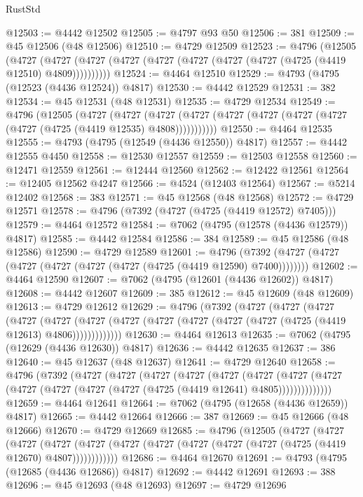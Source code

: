 \begin{lexlean}{RustStd}
\begin{coremodule}
@12503 := @4442 @12502
@12505 := @4797 @93 @50
@12506 := 381
@12509 := @45 @12506 (@48 @12506)
@12510 := @4729 @12509
@12523 := @4796
    (@12505
      (@4727 (@4727 (@4727 (@4727 (@4727 (@4727 (@4727 (@4727 (@4725 (@4419 @12510) @4809))))))))))
@12524 := @4464 @12510
@12529 := @4793 (@4795 (@12523 (@4436 @12524)) @4817)
@12530 := @4442 @12529
@12531 := 382
@12534 := @45 @12531 (@48 @12531)
@12535 := @4729 @12534
@12549 := @4796
    (@12505
      (@4727
        (@4727
          (@4727 (@4727 (@4727 (@4727 (@4727 (@4727 (@4727 (@4725 (@4419 @12535) @4808)))))))))))
@12550 := @4464 @12535
@12555 := @4793 (@4795 (@12549 (@4436 @12550)) @4817)
@12557 := @4442 @12555 @4450
@12558 := @12530 @12557
@12559 := @12503 @12558
@12560 := @12471 @12559
@12561 := @12444 @12560
@12562 := @12422 @12561
@12564 := @12405 @12562 @4247
@12566 := @4524 (@12403 @12564)
@12567 := @5214 @12402
@12568 := 383
@12571 := @45 @12568 (@48 @12568)
@12572 := @4729 @12571
@12578 := @4796 (@7392 (@4727 (@4725 (@4419 @12572) @7405)))
@12579 := @4464 @12572
@12584 := @7062 (@4795 (@12578 (@4436 @12579)) @4817)
@12585 := @4442 @12584
@12586 := 384
@12589 := @45 @12586 (@48 @12586)
@12590 := @4729 @12589
@12601 := @4796 (@7392 (@4727 (@4727 (@4727 (@4727 (@4727 (@4727 (@4725 (@4419 @12590) @7400))))))))
@12602 := @4464 @12590
@12607 := @7062 (@4795 (@12601 (@4436 @12602)) @4817)
@12608 := @4442 @12607
@12609 := 385
@12612 := @45 @12609 (@48 @12609)
@12613 := @4729 @12612
@12629 := @4796
    (@7392
      (@4727
        (@4727
          (@4727
            (@4727
              (@4727
                (@4727 (@4727 (@4727 (@4727 (@4727 (@4727 (@4725 (@4419 @12613) @4806)))))))))))))
@12630 := @4464 @12613
@12635 := @7062 (@4795 (@12629 (@4436 @12630)) @4817)
@12636 := @4442 @12635
@12637 := 386
@12640 := @45 @12637 (@48 @12637)
@12641 := @4729 @12640
@12658 := @4796
    (@7392
      (@4727
        (@4727
          (@4727
            (@4727
              (@4727
                (@4727
                  (@4727
                    (@4727 (@4727 (@4727 (@4727 (@4727 (@4725 (@4419 @12641) @4805))))))))))))))
@12659 := @4464 @12641
@12664 := @7062 (@4795 (@12658 (@4436 @12659)) @4817)
@12665 := @4442 @12664
@12666 := 387
@12669 := @45 @12666 (@48 @12666)
@12670 := @4729 @12669
@12685 := @4796
    (@12505
      (@4727
        (@4727
          (@4727
            (@4727 (@4727 (@4727 (@4727 (@4727 (@4727 (@4727 (@4725 (@4419 @12670) @4807))))))))))))
@12686 := @4464 @12670
@12691 := @4793 (@4795 (@12685 (@4436 @12686)) @4817)
@12692 := @4442 @12691
@12693 := 388
@12696 := @45 @12693 (@48 @12693)
@12697 := @4729 @12696

\end{coremodule}
\end{lexlean}
